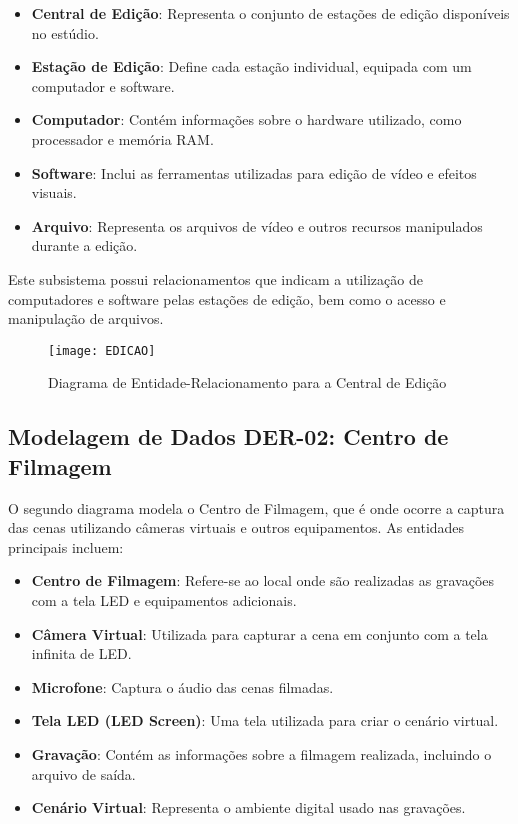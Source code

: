 \begin{itemize}
    \item \textbf{Central de Edição}: Representa o conjunto de estações de edição disponíveis no estúdio.
    \item \textbf{Estação de Edição}: Define cada estação individual, equipada com um computador e software.
    \item \textbf{Computador}: Contém informações sobre o hardware utilizado, como processador e memória RAM.
    \item \textbf{Software}: Inclui as ferramentas utilizadas para edição de vídeo e efeitos visuais.
    \item \textbf{Arquivo}: Representa os arquivos de vídeo e outros recursos manipulados durante a edição.
\end{itemize}

Este subsistema possui relacionamentos que indicam a utilização de computadores e software pelas estações de edição, bem como o acesso e manipulação de arquivos.

\begin{figure}[ht]
    \centering
    \texttt{[image: EDICAO]}
    \caption{Diagrama de Entidade-Relacionamento para a Central de Edição}
    \label{fig:edicao}
\end{figure}

\subsection{Modelagem de Dados DER-02: Centro de Filmagem}
O segundo diagrama modela o Centro de Filmagem, que é onde ocorre a captura das cenas utilizando câmeras virtuais e outros equipamentos. As entidades principais incluem:

\begin{itemize}
    \item \textbf{Centro de Filmagem}: Refere-se ao local onde são realizadas as gravações com a tela LED e equipamentos adicionais.
    \item \textbf{Câmera Virtual}: Utilizada para capturar a cena em conjunto com a tela infinita de LED.
    \item \textbf{Microfone}: Captura o áudio das cenas filmadas.
    \item \textbf{Tela LED (LED Screen)}: Uma tela utilizada para criar o cenário virtual.
    \item \textbf{Gravação}: Contém as informações sobre a filmagem realizada, incluindo o arquivo de saída.
    \item \textbf{Cenário Virtual}: Representa o ambiente digital usado nas gravações.
\end{itemize}

